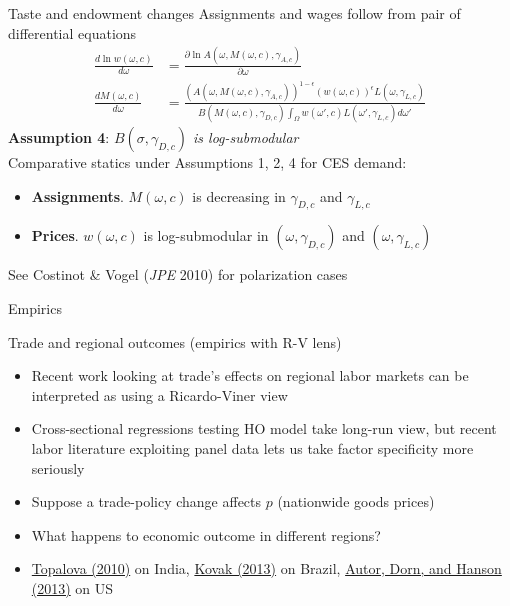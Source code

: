 \documentclass[10pt,notes=hide]{beamer}
\begin{document}
\begin{frame}[label=comparativestatics]{Taste and endowment changes}
Assignments and wages follow from pair of differential equations
\begin{align*}
\frac{d \ln w(\omega,c)}{d\omega} &= \frac{\partial \ln A(\omega,M(\omega,c),\gamma_{A,c})}{\partial \omega} \\
\frac{d M(\omega,c)}{d\omega} &= \frac{(A(\omega,M(\omega,c),\gamma_{A,c}))^{1-\epsilon}(w(\omega,c))^{\epsilon}L(\omega,\gamma_{L,c})}{B(M(\omega,c),\gamma_{D,c})\int_{\Omega}w(\omega',c)L(\omega',\gamma_{L,c})d\omega'}
\end{align*}
\textbf{Assumption 4}: \textit{$B(\sigma,\gamma_{D,c})$ is log-submodular} \\
Comparative statics under Assumptions 1, 2, 4 for CES demand:
\begin{itemize}
	\item \textbf{Assignments}. $M(\omega,c)$ is decreasing in $\gamma_{D,c}$ and $\gamma_{L,c}$  
	\item\textbf{Prices}. $w(\omega,c)$ is log-submodular in $(\omega,\gamma_{D,c})$ and $(\omega,\gamma_{L,c})$
\end{itemize}
See Costinot \& Vogel (\emph{JPE} 2010) for polarization cases
\end{frame}
\begin{frame}{}
\begin{center}\LARGE{Empirics}\end{center}
\end{frame}
\begin{frame}{Trade and regional outcomes (empirics with R-V lens)}
\begin{itemize}
	\item Recent work looking at trade's effects on regional labor markets can be interpreted as using a Ricardo-Viner view
	\item Cross-sectional regressions testing HO model take long-run view, but recent labor literature exploiting panel data lets us take factor specificity more seriously
	\item Suppose a trade-policy change affects $p$ (nationwide goods prices)
	\item What happens to economic outcome in different regions?
	\item \href{https://www.aeaweb.org/articles?id=10.1257/app.2.4.1}{Topalova (2010)} on India,
	\href{https://www.aeaweb.org/articles?id=10.1257/aer.103.5.1960}{Kovak (2013)} on Brazil,
	\href{https://www.aeaweb.org/articles?id=10.1257/aer.103.6.2121}{Autor, Dorn, and Hanson (2013)} on US
\end{itemize}
\end{frame}
\end{document}
